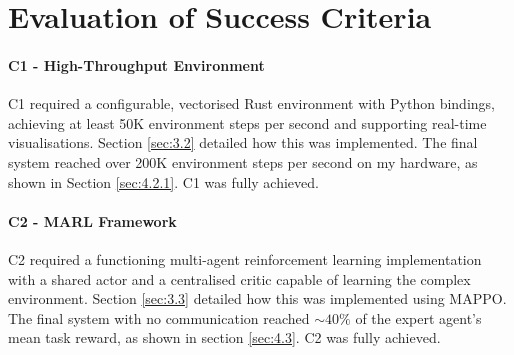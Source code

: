 




\section{Evaluation of Success Criteria}
\label{sec:4.10}

\paragraph{C1 - High-Throughput Environment}
C1 required a configurable, vectorised Rust environment with Python bindings, achieving at least 50K environment steps per second and supporting real-time visualisations.
Section \ref{sec:3.2} detailed how this was implemented.
The final system reached over 200K environment steps per second on my hardware, as shown in Section \ref{sec:4.2.1}.
C1 was fully achieved.

\paragraph{C2 - MARL Framework}
C2 required a functioning multi-agent reinforcement learning implementation with a shared actor and a centralised critic capable of learning the complex environment.
Section \ref{sec:3.3} detailed how this was implemented using MAPPO.
The final system with no communication reached $\sim 40\%$ of the expert agent's mean task reward, as shown in section \ref{sec:4.3}.
C2 was fully achieved.

